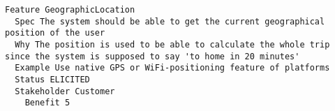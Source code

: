 

\begin{lstlisting}
Feature GeographicLocation
  Spec The system should be able to get the current geographical position of the user
  Why The position is used to be able to calculate the whole trip since the system is supposed to say 'to home in 20 minutes' 
  Example Use native GPS or WiFi-positioning feature of platforms
  Status ELICITED
  Stakeholder Customer
    Benefit 5

\end{lstlisting}